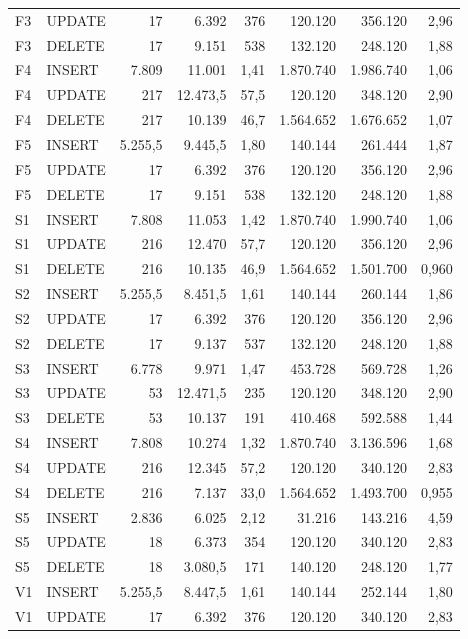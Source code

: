 {\begin{tabular}{llrrrrrr}
F3 & UPDATE & 17 & 6.392 & 376 & 120.120 & 356.120 & 2,96 \\
F3 & DELETE & 17 & 9.151 & 538 & 132.120 & 248.120 & 1,88 \\
F4 & INSERT & 7.809 & 11.001 & 1,41 & 1.870.740 & 1.986.740 & 1,06 \\
F4 & UPDATE & 217 & 12.473,5 & 57,5 & 120.120 & 348.120 & 2,90 \\
F4 & DELETE & 217 & 10.139 & 46,7 & 1.564.652 & 1.676.652 & 1,07 \\
F5 & INSERT & 5.255,5 & 9.445,5 & 1,80 & 140.144 & 261.444 & 1,87 \\
F5 & UPDATE & 17 & 6.392 & 376 & 120.120 & 356.120 & 2,96 \\
F5 & DELETE & 17 & 9.151 & 538 & 132.120 & 248.120 & 1,88 \\
S1 & INSERT & 7.808 & 11.053 & 1,42 & 1.870.740 & 1.990.740 & 1,06 \\
S1 & UPDATE & 216 & 12.470 & 57,7 & 120.120 & 356.120 & 2,96 \\
S1 & DELETE & 216 & 10.135 & 46,9 & 1.564.652 & 1.501.700 & 0,960 \\
S2 & INSERT & 5.255,5 & 8.451,5 & 1,61 & 140.144 & 260.144 & 1,86 \\
S2 & UPDATE & 17 & 6.392 & 376 & 120.120 & 356.120 & 2,96 \\
S2 & DELETE & 17 & 9.137 & 537 & 132.120 & 248.120 & 1,88 \\
S3 & INSERT & 6.778 & 9.971 & 1,47 & 453.728 & 569.728 & 1,26 \\
S3 & UPDATE & 53 & 12.471,5 & 235 & 120.120 & 348.120 & 2,90 \\
S3 & DELETE & 53 & 10.137 & 191 & 410.468 & 592.588 & 1,44 \\
S4 & INSERT & 7.808 & 10.274 & 1,32 & 1.870.740 & 3.136.596 & 1,68 \\
S4 & UPDATE & 216 & 12.345 & 57,2 & 120.120 & 340.120 & 2,83 \\
S4 & DELETE & 216 & 7.137 & 33,0 & 1.564.652 & 1.493.700 & 0,955 \\
S5 & INSERT & 2.836 & 6.025 & 2,12 & 31.216 & 143.216 & 4,59 \\
S5 & UPDATE & 18 & 6.373 & 354 & 120.120 & 340.120 & 2,83 \\
S5 & DELETE & 18 & 3.080,5 & 171 & 140.120 & 248.120 & 1,77 \\
V1 & INSERT & 5.255,5 & 8.447,5 & 1,61 & 140.144 & 252.144 & 1,80 \\
V1 & UPDATE & 17 & 6.392 & 376 & 120.120 & 340.120 & 2,83 \\

\end{tabular}}
